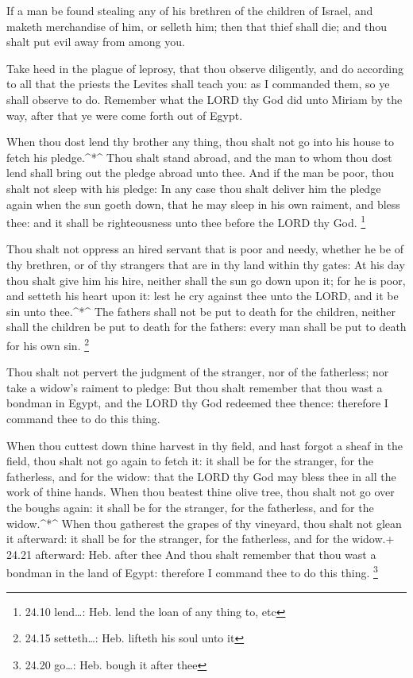  If a man be found stealing any of his brethren of the
children of Israel, and maketh merchandise of him, or selleth him; then
that thief shall die; and thou shalt put evil away from among you.

 Take heed in the plague of leprosy, that thou observe
diligently, and do according to all that the priests the Levites shall
teach you: as I commanded them, so ye shall observe to do. 
Remember what the LORD thy God did unto Miriam by the way, after that ye
were come forth out of Egypt.

 When thou dost lend thy brother any thing, thou shalt not
go into his house to fetch his pledge.\^{}*\^{}  Thou shalt
stand abroad, and the man to whom thou dost lend shall bring out the
pledge abroad unto thee.  And if the man be poor, thou
shalt not sleep with his pledge:  In any case thou shalt
deliver him the pledge again when the sun goeth down, that he may sleep
in his own raiment, and bless thee: and it shall be righteousness unto
thee before the LORD thy God. \footnote{24.10 lend\ldots: Heb. lend the
  loan of any thing to, etc}

 Thou shalt not oppress an hired servant that is poor and
needy, whether he be of thy brethren, or of thy strangers that are in
thy land within thy gates:  At his day thou shalt give him
his hire, neither shall the sun go down upon it; for he is poor, and
setteth his heart upon it: lest he cry against thee unto the LORD, and
it be sin unto thee.\^{}*\^{}  The fathers shall not be put
to death for the children, neither shall the children be put to death
for the fathers: every man shall be put to death for his own sin.
\footnote{24.15 setteth\ldots: Heb. lifteth his soul unto it}

 Thou shalt not pervert the judgment of the stranger, nor
of the fatherless; nor take a widow's raiment to pledge: 
But thou shalt remember that thou wast a bondman in Egypt, and the LORD
thy God redeemed thee thence: therefore I command thee to do this thing.

 When thou cuttest down thine harvest in thy field, and
hast forgot a sheaf in the field, thou shalt not go again to fetch it:
it shall be for the stranger, for the fatherless, and for the widow:
that the LORD thy God may bless thee in all the work of thine hands.
 When thou beatest thine olive tree, thou shalt not go over
the boughs again: it shall be for the stranger, for the fatherless, and
for the widow.\^{}*\^{}  When thou gatherest the grapes of
thy vineyard, thou shalt not glean it afterward: it shall be for the
stranger, for the fatherless, and for the widow.+ 24.21 afterward: Heb.
after thee  And thou shalt remember that thou wast a
bondman in the land of Egypt: therefore I command thee to do this thing.
\footnote{24.20 go\ldots: Heb. bough it after thee}

